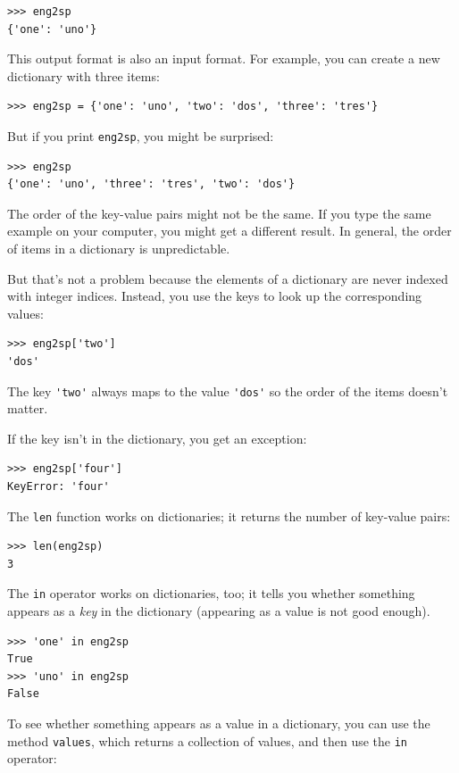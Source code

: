 \documentclass[10pt]{book}
\begin{document}
\begin{verbatim}
>>> eng2sp
{'one': 'uno'}
\end{verbatim}
%
This output format is also an input format.  For example,
you can create a new dictionary with three items:

\begin{verbatim}
>>> eng2sp = {'one': 'uno', 'two': 'dos', 'three': 'tres'}
\end{verbatim}
%
But if you print {\tt eng2sp}, you might be surprised:

\begin{verbatim}
>>> eng2sp
{'one': 'uno', 'three': 'tres', 'two': 'dos'}
\end{verbatim}
%
The order of the key-value pairs might not be the same.  If
you type the same example on your computer, you might get a
different result.  In general, the order of items in
a dictionary is unpredictable.

But that's not a problem because
the elements of a dictionary are never indexed with integer indices.
Instead, you use the keys to look up the corresponding values:

\begin{verbatim}
>>> eng2sp['two']
'dos'
\end{verbatim}
%
The key \verb"'two'" always maps to the value \verb"'dos'" so the order
of the items doesn't matter.

If the key isn't in the dictionary, you get an exception:

\begin{verbatim}
>>> eng2sp['four']
KeyError: 'four'
\end{verbatim}
%
The {\tt len} function works on dictionaries; it returns the
number of key-value pairs:

\begin{verbatim}
>>> len(eng2sp)
3
\end{verbatim}
%
The {\tt in} operator works on dictionaries, too; it tells you whether
something appears as a {\em key} in the dictionary (appearing
as a value is not good enough).

\begin{verbatim}
>>> 'one' in eng2sp
True
>>> 'uno' in eng2sp
False
\end{verbatim}
%
To see whether something appears as a value in a dictionary, you
can use the method {\tt values}, which returns a collection of
values, and then use the {\tt in} operator:
\end{document}
